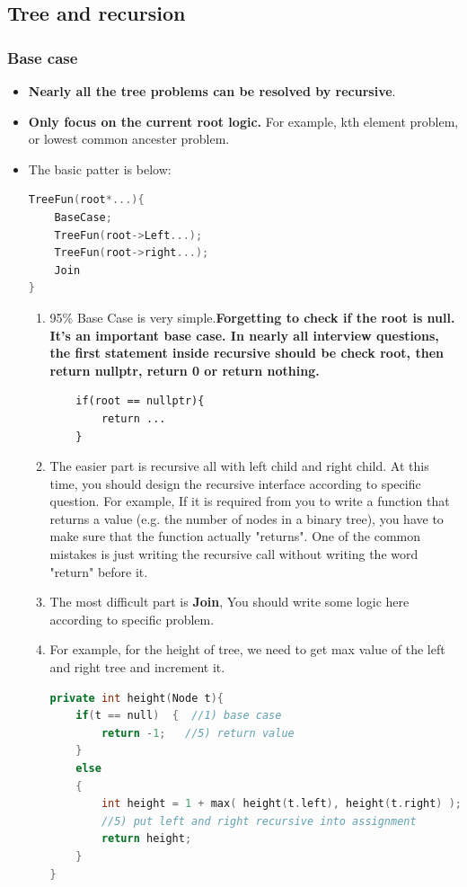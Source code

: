 \documentclass[a4paper,11pt,twoside]{book}
\begin{document}
\subsection{Tree and recursion} 
\subsubsection{Base case}


\begin{itemize}

\item \textbf{Nearly all the tree problems can be resolved by recursive}.

\item \textbf{Only focus on the current root logic.} For example, kth element problem, or lowest common ancester problem.

\item The basic patter is below: 
\begin{lstlisting}[frame=single, language=c++]
TreeFun(root*...){
	BaseCase;
	TreeFun(root->Left...);
	TreeFun(root->right...);
	Join
}
\end{lstlisting}

\begin{enumerate}
	\item 95\% Base Case is very simple.\textbf{Forgetting to check if the root is null. It's an important base case. In nearly all interview questions, the first statement inside recursive should be check root, then return nullptr, return 0 or return nothing.}
\begin{lstlisting}
	if(root == nullptr){
		return ...
	}
\end{lstlisting}
	
	\item The easier part is recursive all with left child and right child. At this time, you should design the recursive interface according to specific question. For example, If it is required from you to write a function that returns a value (e.g. the number of nodes in a binary tree), you have to make sure that the function actually "returns". One of the common mistakes is just writing the recursive call without writing the word "return" before it.
	
	\item The most difficult part is \textbf{Join}, You should write some logic here according to specific problem.
	
	\item For example, for the height of tree, we need to get max value of the left and right tree and increment it. 
\begin{lstlisting}[frame=single, language=c++]
private int height(Node t){
	if(t == null)  {  //1) base case
		return -1;   //5) return value 
	}
	else
	{
		int height = 1 + max( height(t.left), height(t.right) );
		//5) put left and right recursive into assignment
		return height;
	}
}		
\end{lstlisting}	
	
\end{enumerate}

\end{itemize}
\end{document}
